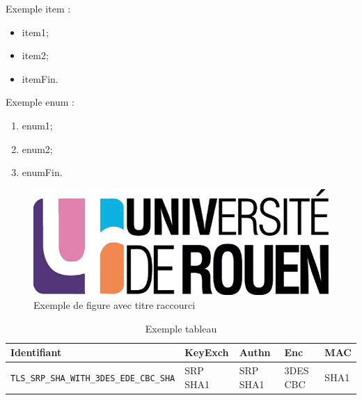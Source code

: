 Exemple item  :
\begin{itemize}
\item item1;
\item item2;
\item itemFin.
\end{itemize}

Exemple enum : 
\begin{enumerate}
\item enum1;
\item enum2;
\item enumFin.
\end{enumerate}


\begin{figure}[H]
\begin{center}
\includegraphics[scale=0.2]{images/logo_univ.png}
\end{center}
\caption[Exemple 1]{Exemple de figure avec titre raccourci}
\label{fig1}
\end{figure}


\begin{table}
\centering
\begin{tabularx}{17cm}{|l|l|l|X|l|}
\hline
\textbf{Identifiant} & \textbf{KeyExch} & \textbf{Authn}& \textbf{Enc}& \textbf{MAC}\\
\hline
\verb+TLS_SRP_SHA_WITH_3DES_EDE_CBC_SHA+&SRP SHA1&SRP SHA1&3DES CBC&SHA1\\
\hline
\end{tabularx}
\caption{Exemple tableau}
\label{tableauEx}
\end{table}

